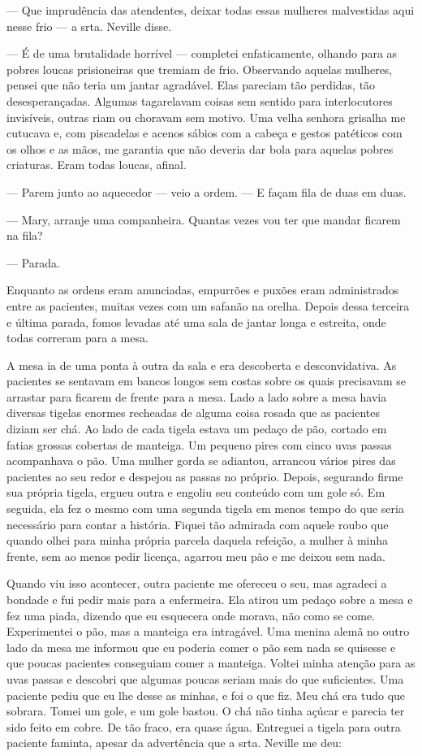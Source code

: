 --- Que imprudência das atendentes, deixar todas essas mulheres
malvestidas aqui nesse frio --- a srta. Neville disse.

--- É de uma brutalidade horrível --- completei enfaticamente, olhando
para as pobres loucas prisioneiras que tremiam de frio. Observando
aquelas mulheres, pensei que não teria um jantar agradável. Elas
pareciam tão perdidas, tão desesperançadas. Algumas tagarelavam coisas
sem sentido para interlocutores invisíveis, outras riam ou choravam sem
motivo. Uma velha senhora grisalha me cutucava e, com piscadelas e
acenos sábios com a cabeça e gestos patéticos com os olhos e as mãos, me
garantia que não deveria dar bola para aquelas pobres criaturas. Eram
todas loucas, afinal. 

--- Parem junto ao aquecedor --- veio a ordem.
--- E façam fila de duas em duas. 

--- Mary, arranje uma companheira. Quantas vezes vou ter que mandar ficarem na fila? 

--- Parada. 

Enquanto as ordens eram anunciadas, empurrões e puxões eram
administrados entre as pacientes, muitas vezes com um safanão na orelha.
Depois dessa terceira e última parada, fomos levadas até uma sala de
jantar longa e estreita, onde todas correram para a mesa.

A mesa ia de uma ponta à outra da sala e era descoberta e
desconvidativa. As pacientes se sentavam em bancos longos sem costas
sobre os quais precisavam se arrastar para ficarem de frente para a
mesa. Lado a lado sobre a mesa havia diversas tigelas enormes recheadas
de alguma coisa rosada que as pacientes diziam ser chá. Ao lado de cada
tigela estava um pedaço de pão, cortado em fatias grossas cobertas de
manteiga. Um pequeno pires com cinco uvas passas acompanhava o pão. Uma
mulher gorda se adiantou, arrancou vários pires das pacientes ao seu
redor e despejou as passas no próprio. Depois, segurando firme sua
própria tigela, ergueu outra e engoliu seu conteúdo com um gole só. Em
seguida, ela fez o mesmo com uma segunda tigela em menos tempo do que
seria necessário para contar a história. Fiquei tão admirada com aquele
roubo que quando olhei para minha própria parcela daquela refeição, a
mulher à minha frente, sem ao menos pedir licença, agarrou meu pão e me
deixou sem nada.

Quando viu isso acontecer, outra paciente me ofereceu o seu, mas
agradeci a bondade e fui pedir mais para a enfermeira. Ela atirou um
pedaço sobre a mesa e fez uma piada, dizendo que eu esquecera onde
morava, não como se come. Experimentei o pão, mas a manteiga era
intragável. Uma menina alemã no outro lado da mesa me informou que eu
poderia comer o pão sem nada se quisesse e que poucas pacientes
conseguiam comer a manteiga. Voltei minha atenção para as uvas passas e
descobri que algumas poucas seriam mais do que suficientes. Uma paciente
pediu que eu lhe desse as minhas, e foi o que fiz. Meu chá era tudo que
sobrara. Tomei um gole, e um gole bastou. O chá não tinha açúcar e
parecia ter sido feito em cobre. De tão fraco, era quase água. Entreguei
a tigela para outra paciente faminta, apesar da advertência que a srta.
Neville me deu:

